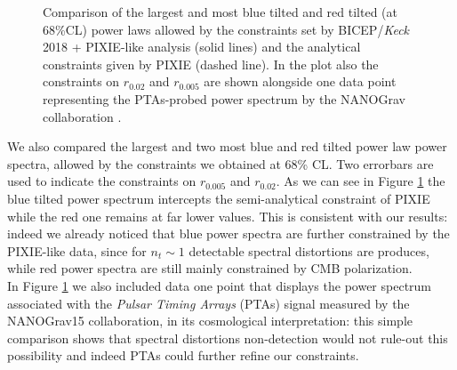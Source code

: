 \begin{figure}[t]
    \centering
{}
\caption{Comparison of the largest and most blue tilted and red tilted (at 68\%CL) power laws allowed  by the constraints set by BICEP/\emph{Keck} 2018 + PIXIE-like analysis (solid lines) and the analytical constraints given by PIXIE (dashed line). In the plot also the constraints on $r_{0.02}$ and $r_{0.005}$ are shown alongside one data point representing the PTAs-probed power spectrum by the NANOGrav collaboration \cite{NANOGrav}. }
\label{fig:analy_const_BK18}
\end{figure}

We also compared the largest and two most blue and red tilted power law power spectra, allowed by the constraints we obtained at 68\% CL. Two errorbars are used to indicate the constraints on $r_{0.005}$ and $r_{0.02}$. As we can see in Figure \ref{fig:analy_const_BK18} the blue tilted power spectrum intercepts the semi-analytical constraint of PIXIE while the red one remains at far lower values. This is consistent with our results: indeed we already noticed that blue power spectra are further constrained by the PIXIE-like data, since for $n_t\sim1$ detectable spectral distortions are produces, while red power spectra are still mainly constrained by CMB polarization.\\ In Figure \ref{fig:analy_const_BK18} we also included data one point that displays the power spectrum associated with the \emph{Pulsar Timing Arrays} (PTAs) signal measured by the NANOGrav15 \cite{NANOGrav} collaboration, in its cosmological interpretation: this simple comparison shows that spectral distortions non-detection would not rule-out this possibility and indeed PTAs could further refine our constraints.


